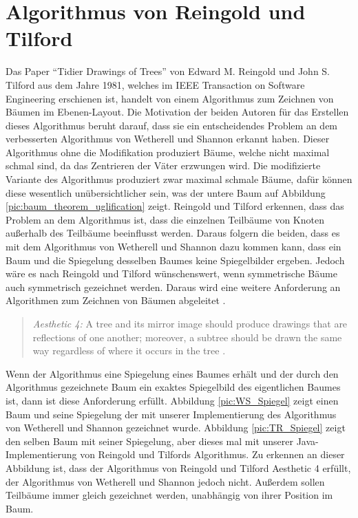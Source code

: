\label{chap:kapitel3_3}
\section{Algorithmus von Reingold und Tilford}

Das Paper “Tidier Drawings of Trees” von Edward M. Reingold und John S. Tilford aus dem Jahre 1981,
welches im IEEE Transaction on Software Engineering erschienen ist, handelt von einem Algorithmus zum Zeichnen von Bäumen im Ebenen-Layout\cite[]{q2}.
Die Motivation der beiden Autoren für das Erstellen dieses Algorithmus beruht darauf, dass sie ein entscheidendes Problem an dem 
verbesserten Algorithmus von Wetherell und Shannon erkannt haben. Dieser Algorithmus ohne die Modifikation produziert Bäume, 
welche nicht maximal schmal sind, da das Zentrieren der Väter erzwungen wird. Die modifizierte Variante des 
Algorithmus produziert zwar maximal schmale Bäume, dafür können diese wesentlich unübersichtlicher sein, 
was der untere Baum auf Abbildung \ref{pic:baum_theorem_uglification} zeigt. 
Reingold und Tilford erkennen, dass das Problem an dem Algorithmus ist, dass die einzelnen Teilbäume von Knoten außerhalb des Teilbäume 
beeinflusst werden. Daraus folgern die beiden, dass es mit dem Algorithmus von Wetherell und Shannon dazu kommen kann, dass ein Baum und 
die Spiegelung desselben Baumes keine Spiegelbilder ergeben. Jedoch wäre es nach Reingold und Tilford wünschenswert, wenn symmetrische Bäume 
auch symmetrisch gezeichnet werden. Daraus wird eine weitere Anforderung an Algorithmen zum Zeichnen von Bäumen abgeleitet \cite[]{q2}.

\begin{quotation}
	\textit{Aesthetic 4:} A tree and its mirror image should produce
    drawings that are reflections of one another; moreover, a subtree
    should be drawn the same way regardless of where it
    occurs in the tree \cite[]{q4}.
\end{quotation}

Wenn der Algorithmus eine Spiegelung eines Baumes erhält und der durch den Algorithmus gezeichnete Baum ein exaktes Spiegelbild des 
eigentlichen Baumes ist, dann ist diese Anforderung erfüllt. Abbildung \ref{pic:WS_Spiegel} zeigt einen Baum und seine Spiegelung der mit 
unserer Implementierung des Algorithmus von Wetherell und Shannon gezeichnet wurde. Abbildung \ref{pic:TR_Spiegel} zeigt den selben Baum mit 
seiner Spiegelung, aber dieses mal mit unserer Java-Implementierung von Reingold und Tilfords Algorithmus. Zu erkennen an dieser Abbildung ist, 
dass der Algorithmus von Reingold und Tilford Aesthetic 4 erfüllt, der Algorithmus von Wetherell und Shannon jedoch nicht. Außerdem sollen 
Teilbäume immer gleich gezeichnet werden, unabhängig von ihrer Position im Baum.

